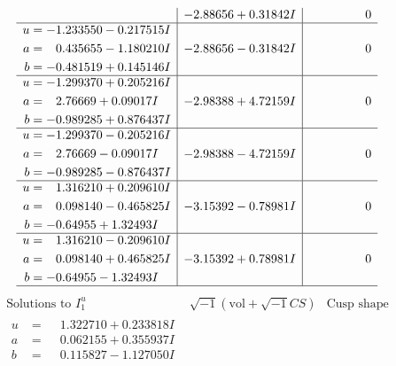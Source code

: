\documentclass[1p]{elsarticle_modified}
\theoremstyle{definition}
\newcommand{\I}{\sqrt{-1}}
\begin{document}
$$\begin{array}{c|c|c}
 & -2.88656 + 0.31842 I & \phantom{-0.000000 } 0 \\ \hline\begin{aligned}
u &= -1.233550 - 0.217515 I \\
a &= \phantom{-}0.435655 - 1.180210 I \\
b &= -0.481519 + 0.145146 I\end{aligned}
 & -2.88656 - 0.31842 I & \phantom{-0.000000 } 0 \\ \hline\begin{aligned}
u &= -1.299370 + 0.205216 I \\
a &= \phantom{-}2.76669 + 0.09017 I \\
b &= -0.989285 + 0.876437 I\end{aligned}
 & -2.98388 + 4.72159 I & \phantom{-0.000000 } 0 \\ \hline\begin{aligned}
u &= -1.299370 - 0.205216 I \\
a &= \phantom{-}2.76669 - 0.09017 I \\
b &= -0.989285 - 0.876437 I\end{aligned}
 & -2.98388 - 4.72159 I & \phantom{-0.000000 } 0 \\ \hline\begin{aligned}
u &= \phantom{-}1.316210 + 0.209610 I \\
a &= \phantom{-}0.098140 - 0.465825 I \\
b &= -0.64955 + 1.32493 I\end{aligned}
 & -3.15392 - 0.78981 I & \phantom{-0.000000 } 0 \\ \hline\begin{aligned}
u &= \phantom{-}1.316210 - 0.209610 I \\
a &= \phantom{-}0.098140 + 0.465825 I \\
b &= -0.64955 - 1.32493 I\end{aligned}
 & -3.15392 + 0.78981 I & \phantom{-0.000000 } 0\\
 \hline 
 \end{array}$$\newpage$$\begin{array}{c|c|c}  
\text{Solutions to }I^u_{1}& \I (\text{vol} + \sqrt{-1}CS) & \text{Cusp shape}\\
 \hline 
\begin{aligned}
u &= \phantom{-}1.322710 + 0.233818 I \\
a &= \phantom{-}0.062155 + 0.355937 I \\
b &= \phantom{-}0.115827 - 1.127050 I\end{aligned}

\end{array}$$
\end{document}
